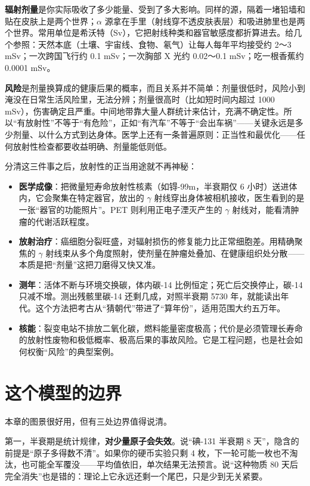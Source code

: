 \textbf{辐射剂量}是你实际吸收了多少能量、受到了多大影响。同样的源，隔着一堵铅墙和贴在皮肤上是两个世界；$\alpha$ 源拿在手里（射线穿不透皮肤表层）和吸进肺里也是两个世界。常用单位是希沃特（Sv），它把射线种类和器官敏感度都折算进去。给几个参照：天然本底（土壤、宇宙线、食物、氡气）让每人每年平均接受约 2～3 mSv；一次跨国飞行约 0.1 mSv；一次胸部 X 光约 0.02～0.1 mSv；吃一根香蕉约 0.0001 mSv。

\textbf{风险}是剂量换算成的健康后果的概率，而且关系并不简单：剂量很低时，风险小到淹没在日常生活风险里，无法分辨；剂量很高时（比如短时间内超过 1000 mSv），伤害确定且严重。中间地带靠大量人群统计来估计，充满不确定性。所以“有放射性”不等于“有危险”，正如“有汽车”不等于“会出车祸”——关键永远是多少剂量、以什么方式到达身体。医学上还有一条普遍原则：正当性和最优化——任何放射性检查都要收益明确、剂量能低则低。

分清这三件事之后，放射性的正当用途就不再神秘：

\begin{itemize}[itemsep=2pt]
\item \textbf{医学成像}：把微量短寿命放射性核素（如锝-99m，半衰期仅 6 小时）送进体内，它会聚集在特定器官，放出的 $\gamma$ 射线穿出身体被相机接收，医生看到的是一张“器官的功能照片”。PET 则利用正电子湮灭产生的 $\gamma$ 射线对，能看清肿瘤的代谢活跃程度。
\item \textbf{放射治疗}：癌细胞分裂旺盛，对辐射损伤的修复能力比正常细胞差。用精确聚焦的 $\gamma$ 射线束从多个角度照射，使剂量在肿瘤处叠加、在健康组织处分散——本质是把“剂量”这把刀磨得又快又准。
\item \textbf{测年}：活体不断与环境交换碳，体内碳-14 比例恒定；死亡后交换停止，碳-14 只减不增。测出残骸里碳-14 还剩几成，对照半衰期 5730 年，就能读出年代。这个方法把考古从“猜朝代”带进了“算年份”，适用范围大约五万年。
\item \textbf{核能}：裂变电站不排放二氧化碳，燃料能量密度极高；代价是必须管理长寿命的放射性废物和极低概率、极高后果的事故风险。它是工程问题，也是社会如何权衡“风险”的典型案例。
\end{itemize}

\section{这个模型的边界}

本章的图景很好用，但有三处边界值得说清。

第一，半衰期是统计规律，\textbf{对少量原子会失效}。说“碘-131 半衰期 8 天”，隐含的前提是“原子多得数不清”。如果你的硬币实验只剩 4 枚，下一轮可能一枚也不淘汰，也可能全军覆没——平均值依旧，单次结果无法预言。说“这种物质 80 天后完全消失”也是错的：理论上它永远还剩一个尾巴，只是少到无关紧要。

